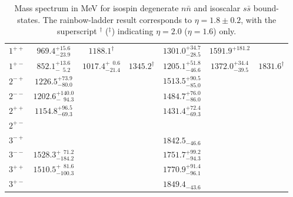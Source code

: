 \begin{table}[!th]
\begin{tabular}{c|ccc|ccc|}
$1^{++}$                    & $969.4^{+15.6}_{-23.9}$              & $1188.1^\dag$                      &                &  $1301.0^{+34.7}_{-28.5}$ &  $1591.9^{+181.2}$        &                   \\
$1^{+-}$                    & $852.1^{+13.6}_{-\phantom{1}5.2}$    & $1017.4^{+\phantom{1}0.6}_{-21.4}$ & $1345.2^\dag$  &  $1205.1^{+51.8}_{-46.6}$ &  $1372.0^{+34.4}_{-39.5}$ &   $1831.6^\dag$   \\
\hline                                                                                                                                                                                                     
$2^{-+}$                    & $1226.5^{+73.9}_{-80.0}$             &                                    &                &  $1513.5^{+90.5}_{-85.0}$ &                           &                   \\
$2^{--}$                    & $1202.6^{+140.0}_{-\phantom{1}94.3}$ &                                    &                &  $1484.7^{+76.0}_{-86.0}$ &                           &                   \\
$2^{++}$                    & $1154.8^{+96.5}_{-69.3}$             &                                    &                &  $1431.4^{+72.4}_{-69.3}$ &                           &                   \\
$2^{+-}$                    &                                      &                                    &                &                           &                           &                   \\
\hline                                                                                                                                                                                                     
$3^{-+}$                    &                                      &                                    &                &  $1842.5_{-46.6}$         &                           &                   \\
$3^{--}$                    & $1528.3^{+\phantom{1}71.2}_{-184.2}$ &                                    &                &  $1751.7^{+99.2}_{-94.3}$ &                           &                   \\
$3^{++}$                    & $1510.5^{+\phantom{1}81.6}_{-100.3}$ &                                    &                &  $1770.9^{+91.4}_{-96.1}$ &                           &                   \\
$3^{+-}$                    &  								   		&                                    &                &  $1849.4_{-43.6}$ 		   &                      	     &           			\\                                                                                                                                                                      
\hline
\hline
\end{tabular}
\caption{Mass spectrum in MeV for isospin degenerate $n\bar{n}$ and isoscalar $s\bar{s}$ bound-states. The rainbow-ladder result corresponds to $\eta=1.8\pm0.2$, with the 
superscript ${}^\dag$ (${}^\ddag$) indicating $\eta=2.0$ ($\eta=1.6$) only.}\label{tab:results_n&s}
\end{table}
